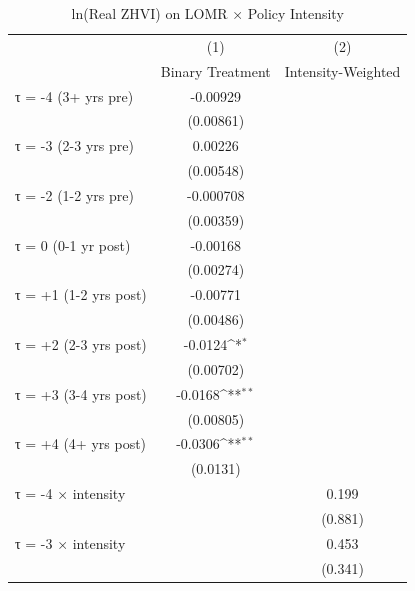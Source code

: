 \begin{table}[htbp]\centering
\def\sym#1{\ifmmode^{#1}\else\(^{#1}\)\fi}
\caption{ln(Real ZHVI) on LOMR × Policy Intensity}
\begin{tabular}{l*{2}{c}}
\hline\hline
                    &\multicolumn{1}{c}{(1)}&\multicolumn{1}{c}{(2)}\\
                    &\multicolumn{1}{c}{Binary Treatment}&\multicolumn{1}{c}{Intensity-Weighted}\\
\hline
τ = -4 (3+ yrs pre) &    -0.00929         &                     \\
                    &   (0.00861)         &                     \\
[1em]
τ = -3 (2-3 yrs pre)&     0.00226         &                     \\
                    &   (0.00548)         &                     \\
[1em]
τ = -2 (1-2 yrs pre)&   -0.000708         &                     \\
                    &   (0.00359)         &                     \\
[1em]
τ = 0 (0-1 yr post) &    -0.00168         &                     \\
                    &   (0.00274)         &                     \\
[1em]
τ = +1 (1-2 yrs post)&    -0.00771         &                     \\
                    &   (0.00486)         &                     \\
[1em]
τ = +2 (2-3 yrs post)&     -0.0124\sym{*}  &                     \\
                    &   (0.00702)         &                     \\
[1em]
τ = +3 (3-4 yrs post)&     -0.0168\sym{**} &                     \\
                    &   (0.00805)         &                     \\
[1em]
τ = +4 (4+ yrs post)&     -0.0306\sym{**} &                     \\
                    &    (0.0131)         &                     \\
[1em]
τ = -4 × intensity  &                     &       0.199         \\
                    &                     &     (0.881)         \\
[1em]
τ = -3 × intensity  &                     &       0.453         \\
                    &                     &     (0.341)         \\

\end{tabular}
\end{table}
